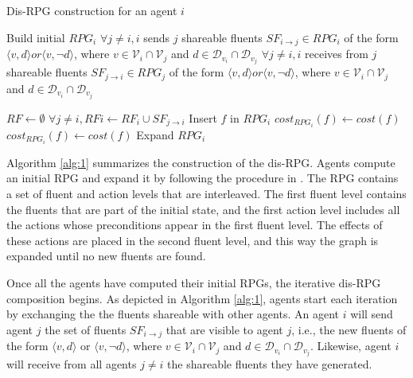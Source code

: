 \documentclass[12pt]{article}
\begin{document}
\begin{algorithm}
\caption{Dis-RPG construction for an agent $i$}
\label{alg:1}
  \begin{algorithmic}
  \State Build initial $RPG_i$
  \Repeat
    \State $\forall j \neq i, i$ sends $j$ shareable fluents $SF_{i\rightarrow j} \in RPG_i$ of the form $\langle v,d\rangle or \langle v,\neg d\rangle$, where $v \in \mathcal{V}_i \cap \mathcal{V}_j$ and $d \in \mathcal{D}_{v_i} \cap \mathcal{D}_{v_j}$
    \State $\forall j \neq i, i$ receives from $j$ shareable fluents $SF_{j\rightarrow i} \in RPG_j$ of the form $\langle v,d\rangle or \langle v,\neg d\rangle$, where $v \in \mathcal{V}_i \cap \mathcal{V}_j$ and $d \in \mathcal{D}_{v_i} \cap \mathcal{D}_{v_j}$

      \State $RF \leftarrow \emptyset$
      $\forall j \neq i, RFi \leftarrow RF_i \cup SF_{j\rightarrow i}$
          \State Insert $f$ in $RPG_i$
          \State $cost_{RPG_i}(f) \leftarrow cost(f)$
        \EndIf
          \State $cost_{RPG_i}(f) \leftarrow cost(f)$
        \EndIf
      \EndFor
      \State Expand $RPG_i$
  \end{algorithmic}
\end{algorithm}

Algorithm \ref{alg:1} summarizes the construction of the dis-RPG.
Agents compute an initial RPG and expand it by following the procedure in \cite{Hoffmann2011TheFP}.
The RPG contains a set of fluent and action levels that are interleaved.
The first fluent level contains the fluents that are part of the initial state, and the first action level includes all the actions whose preconditions appear in the first fluent level.
The effects of these actions are placed in the second fluent level, and this way the graph is expanded until no new fluents are found.

Once all the agents have computed their initial RPGs, the iterative dis-RPG composition begins.
As depicted in Algorithm \ref{alg:1}, agents start each iteration by exchanging the the fluents shareable with other agents.
An agent $i$ will send agent $j$ the set of fluents $SF_{i\rightarrow j}$ that are visible to agent $j$, i.e., the new fluents of the form $\langle v,d\rangle$ or $\langle v,\neg d\rangle$, where $v \in \mathcal{V}_i \cap \mathcal{V}_j$ and $d \in \mathcal{D}_{v_i} \cap \mathcal{D}_{v_j}$.
Likewise, agent $i$ will receive from all agents $j \neq i$ the shareable fluents they have generated.
\end{document}
